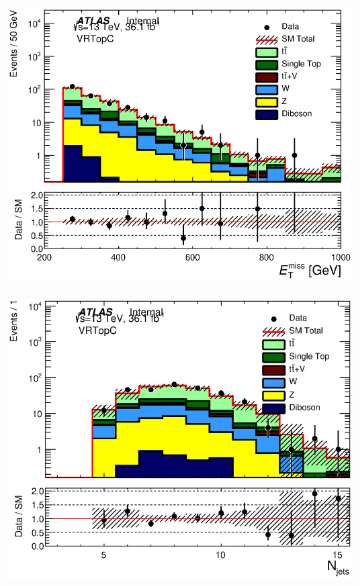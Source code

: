 \begin{figure}[h!]
  \begin{center}
      \begin{subfigure}[b]{0.40\textwidth}    
    	 \includegraphics[width=\textwidth]{figures/plotRegion/Met_VRTopC_log.eps}
                \caption{ }
    \end{subfigure}
        \begin{subfigure}[b]{0.40\textwidth}    
    	 \includegraphics[width=\textwidth]{figures/plotRegion/NJets_VRTopC_log.eps}
                \caption{ }
    \end{subfigure}

\end{center}
\end{figure}
